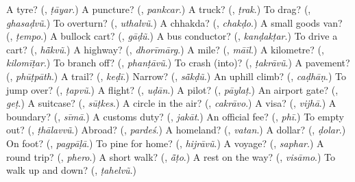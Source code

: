 \begin{tcolorbox}[breakable,colback=teal!4,colframe=teal!35!black,title={Before you move on}]
A tyre? (\textbf{}, \emph{ṭāyar}.) A puncture? (\textbf{}, \emph{pankcar}.) A truck? (\textbf{}, \emph{ṭrak}.) To drag? (\textbf{}, \emph{ghasaḍvũ}.) To overturn? (\textbf{}, \emph{uthalvũ}.) A chhakda? (\textbf{}, \emph{chakḍo}.) A small goods van? (\textbf{}, \emph{ṭempo}.) A bullock cart? (\textbf{}, \emph{gāḍũ}.) A bus conductor? (\textbf{}, \emph{kanḍakṭar}.) To drive a cart? (\textbf{}, \emph{hā̃kvũ}.) A highway? (\textbf{}, \emph{dhorīmārg}.) A mile? (\textbf{}, \emph{māīl}.) A kilometre? (\textbf{}, \emph{kilomīṭar}.) To branch off? (\textbf{}, \emph{phanṭāvũ}.) To crash (into)? (\textbf{}, \emph{ṭakrāvũ}.) A pavement? (\textbf{}, \emph{phūṭpāth}.) A trail? (\textbf{}, \emph{keḍī}.) Narrow? (\textbf{}, \emph{sā̃kḍũ}.) An uphill climb? (\textbf{}, \emph{caḍhāṇ}.) To jump over? (\textbf{}, \emph{ṭapvũ}.) A flight? (\textbf{}, \emph{uḍān}.) A pilot? (\textbf{}, \emph{pāylaṭ}.) An airport gate? (\textbf{}, \emph{geṭ}.) A suitcase? (\textbf{}, \emph{sūṭkes}.) A circle in the air? (\textbf{}, \emph{cakrāvo}.) A visa? (\textbf{}, \emph{vijhā}.) A boundary? (\textbf{}, \emph{sīmā}.) A customs duty? (\textbf{}, \emph{jakāt}.) An official fee? (\textbf{}, \emph{phī}.) To empty out? (\textbf{}, \emph{ṭhālavvũ}.) Abroad? (\textbf{}, \emph{pardeś}.) A homeland? (\textbf{}, \emph{vatan}.) A dollar? (\textbf{}, \emph{ḍolar}.) On foot? (\textbf{}, \emph{pagpāḷā}.) To pine for home? (\textbf{}, \emph{hijrāvũ}.) A voyage? (\textbf{}, \emph{saphar}.) A round trip? (\textbf{}, \emph{phero}.) A short walk? (\textbf{}, \emph{ā̃ṭo}.) A rest on the way? (\textbf{}, \emph{visāmo}.) To walk up and down? (\textbf{}, \emph{ṭahelvũ}.)
\end{tcolorbox}
